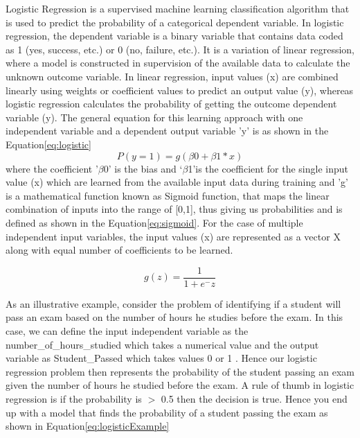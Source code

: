 \documentclass[11pt,openright]{report}
\begin{document}
Logistic Regression is a supervised machine learning classification algorithm that is used to predict the probability of a categorical dependent variable. In logistic regression, the dependent variable is a binary variable that contains data coded as 1 (yes, success, etc.) or 0 (no, failure, etc.). It is a variation of linear regression, where a model is constructed in supervision of the available data to calculate the unknown outcome variable. In linear regression, input values (x) are combined linearly using weights or coefficient values to predict an output value (y), whereas logistic regression calculates the probability of getting the outcome dependent variable (y). The general equation for this learning approach with one independent variable and a dependent output variable 'y' is as shown in the Equation\ref{eq:logistic} 
\begin{equation}
 P(y=1)= g(\beta0+\beta1 *x )  \label{eq:logistic} 
 \end{equation}
 where the coefficient '$\beta$0' is the bias and \lq$\beta$1\rq  is the coefficient for the single input value (x) which are learned from the available input data during training and 'g' is a mathematical function known as Sigmoid function, that maps the linear combination of inputs into the range of [0,1], thus giving us probabilities and is defined as shown in the Equation\ref{eq:sigmoid}. For the case of multiple independent input variables, the input values (x) are represented as a vector X along with equal number of coefficients to be learned.
 
\begin{equation}
 g(z) =  \frac{\mathrm{1} }{\mathrm{1} + e^- z }  \label{eq:sigmoid} 
 \end{equation}

As an illustrative example, consider the problem of identifying if a student will pass an exam based on the number of hours he studies before the exam. In this case, we can define the input independent variable as the number\_of\_hours\_studied which takes a numerical value and the output variable as Student\_Passed which takes values { 0 or 1 }. Hence our logistic regression problem then represents the probability of the student passing an exam given the number of hours he studied before the exam. A rule of thumb in logistic regression is if the probability is $>$ 0.5 then the decision is true. Hence you end up with a model that finds the probability of a student passing the exam  as shown in Equation\ref{eq:logisticExample}
\end{document}
